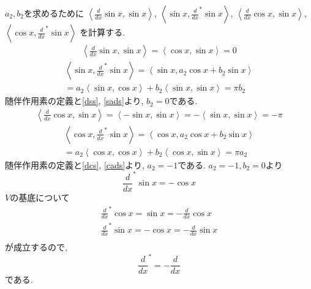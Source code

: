 \documentclass[a4paper,11pt]{jsarticle}
\begin{document}
$a_2, b_2$を求めるために 
$\left<\frac{d}{dx}\sin{x}, \sin{x}\right>$,
$\left<\sin{x}, \frac{d}{dx}^*\sin{x}\right>$,
$\left<\frac{d}{dx}\cos{x}, \sin{x}\right>$,
$\left<\cos{x}, \frac{d}{dx}^*\sin{x}\right>$
を計算する.
\begin{eqnarray}
  \left<\frac{d}{dx}\sin{x}, \sin{x}\right>
  = \left<\cos{x}, \sin{x}\right>
  = 0 \label{dss}
\end{eqnarray}
\begin{equation}
  \begin{split}
    \left<\sin{x}, \frac{d}{dx}^*\sin{x}\right>
    = \left<\sin{x}, a_2\cos{x} + b_2\sin{x}\right> \\
    = a_2\left<\sin{x}, \cos{x}\right> + b_2\left<\sin{x}, \sin{x}\right>
    = \pi b_2
  \end{split}
  \label{sads}
\end{equation}
随伴作用素の定義と\eqref{dss}, \eqref{sads}より, $b_2=0$である.
\begin{eqnarray}
  \left<\frac{d}{dx}\cos{x}, \sin{x}\right>
  = \left<-\sin{x}, \sin{x}\right>
  = -\left<\sin{x}, \sin{x}\right>
  = -\pi \label{dcs}
\end{eqnarray}
\begin{equation}
  \begin{split}
    \left<\cos{x}, \frac{d}{dx}^*\sin{x}\right>
    = \left<\cos{x}, a_2\cos{x} + b_2\sin{x}\right> \\
    = a_2\left<\cos{x}, \cos{x}\right> + b_2\left<\cos{x}, \sin{x}\right>
    = \pi a_2
  \end{split}
  \label{cads}
\end{equation}
随伴作用素の定義と\eqref{dcs}, \eqref{cads}より, $a_2=-1$である.
$a_2 = -1, b_2 = 0$より
\[
  \frac{d}{dx}^*\sin{x} = -\cos{x}
\]
$V$の基底について
\begin{eqnarray*}
  \frac{d}{dx}^*\cos{x} = \sin{x} = -\frac{d}{dx}\cos{x} \\
  \frac{d}{dx}^*\sin{x} = -\cos{x} = -\frac{d}{dx}\sin{x} \\
\end{eqnarray*}
が成立するので, 
\[
  \frac{d}{dx}^* = -\frac{d}{dx}
\]
である.
\end{document}
